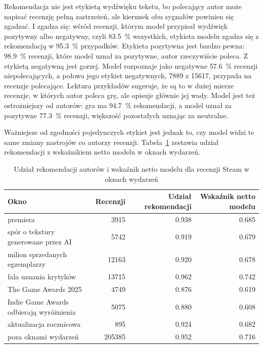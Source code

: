 Rekomendacja nie jest etykietą wydźwięku tekstu, bo polecający autor może napisać recenzję pełną zastrzeżeń, ale kierunek obu sygnałów powinien się zgadzać.
I zgadza się: wśród recenzji, którym model przypisał wydźwięk pozytywny albo negatywny, czyli \qty{83.5}{\percent} wszystkich, etykieta modelu zgadza się z rekomendacją w \qty{95.3}{\percent} przypadków.
Etykieta pozytywna jest bardzo pewna: \qty{98.9}{\percent} recenzji, które model uznał za pozytywne, autor rzeczywiście poleca.
Z etykietą negatywną jest gorzej.
Model rozpoznaje jako negatywne \qty{57.6}{\percent} recenzji niepolecających, a połowa jego etykiet negatywnych, \num{7889} z \num{15617}, przypada na recenzje polecające.
Lektura przykładów sugeruje, że są to w dużej mierze recenzje, w których autor poleca grę, ale opisuje głównie jej wady.
Model jest też ostrożniejszy od autorów: gra ma \qty{94.7}{\percent} rekomendacji, a model uznał za pozytywne \qty{77.3}{\percent} recenzji, większość pozostałych uznając za neutralne.

Ważniejsze od zgodności pojedynczych etykiet jest jednak to, czy model widzi te same zmiany nastrojów co autorzy recenzji.
Tabela~\ref{tab:weak-events} zestawia udział rekomendacji z wskaźnikiem netto modelu w oknach wydarzeń.

\begin{table}[hbp]
  \caption{Udział rekomendacji autorów i wskaźnik netto modelu dla recenzji Steam w oknach wydarzeń}
  \label{tab:weak-events}
  \centering
  \small
  \begin{tabular}{|l|r|r|r|}
    \hline
    Okno                                     & Recenzji       & Udział rekomendacji     & Wskaźnik netto modelu \\
    \hline
    premiera                                 & \num{3915}     & \num{0.938}             & \num{0.685}           \\
    \hline
    spór o tekstury generowane przez AI      & \num{5742}     & \num{0.919}             & \num{0.679}           \\
    \hline
    milion sprzedanych egzemplarzy           & \num{12163}    & \num{0.920}             & \num{0.678}           \\
    \hline
    fala uznania krytyków                    & \num{13715}    & \num{0.962}             & \num{0.742}           \\
    \hline
    The Game Awards 2025                     & \num{4749}     & \num{0.876}             & \num{0.619}           \\
    \hline
    Indie Game Awards odbierają wyróżnienia  & \num{5075}     & \num{0.880}             & \num{0.608}           \\
    \hline
    aktualizacja rocznicowa                  & \num{895}      & \num{0.924}             & \num{0.682}           \\
    \hline
    poza oknami wydarzeń                     & \num{205385}   & \num{0.952}             & \num{0.716}           \\
    \hline
  \end{tabular}
\end{table}

